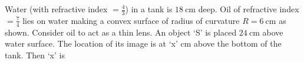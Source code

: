 
\item Water (with refractive index $=\frac{4}{3}$) in a tank is $18\ \text{cm}$ deep. Oil of refractive index $=\frac{7}{4}$ lies on water making a convex surface of radius of curvature $R = 6\ \text{cm}$ as shown. Consider oil to act as a thin lens. An object `S' is placed $24\ \text{cm}$ above water surface. The location of its image is at `x' cm above the bottom of the tank. Then `x' is
    \begin{center}
        \begin{tikzpicture}
        \end{tikzpicture}
    \end{center}
